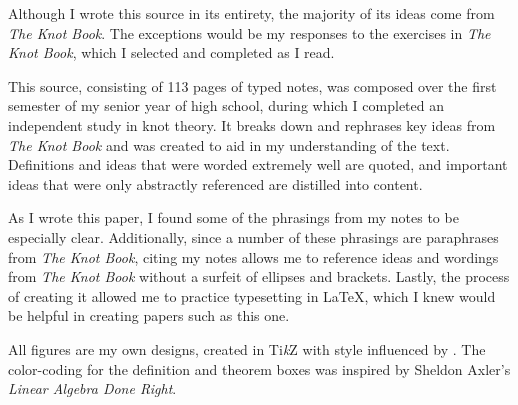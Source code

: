 \documentclass[titlepage]{article}
\newenvironment{bibcomment}{
    \item[]
    \begingroup
    \par
    \parshape0
}{
    \par
    \endgroup
}
\begin{document}
\begin{thebibliography}{1}
    \begin{bibcomment}
        \setlength{\leftskip}{1cm}
        Although I wrote this source in its entirety, the majority of its ideas come from \emph{The Knot Book}. The exceptions would be my responses to the exercises in \emph{The Knot Book}, which I selected and completed as I read.\par
        \hspace{1em}This source, consisting of 113 pages of typed notes, was composed over the first semester of my senior year of high school, during which I completed an independent study in knot theory. It breaks down and rephrases key ideas from \emph{The Knot Book} and was created to aid in my understanding of the text. Definitions and ideas that were worded extremely well are quoted, and important ideas that were only abstractly referenced are distilled into content.\par
        \hspace{1em}As I wrote this paper, I found some of the phrasings from my notes to be especially clear. Additionally, since a number of these phrasings are paraphrases from \emph{The Knot Book}, citing my notes allows me to reference ideas and wordings from \emph{The Knot Book} without a surfeit of ellipses and brackets. Lastly, the process of creating it allowed me to practice typesetting in LaTeX, which I knew would be helpful in creating papers such as this one.
    \end{bibcomment}
\end{thebibliography}

\noindent All figures are my own designs, created in Ti\emph{k}Z with style influenced by \cite{bib:knotbook}. The color-coding for the definition and theorem boxes was inspired by Sheldon Axler's \emph{Linear Algebra Done Right}.
\end{document}
